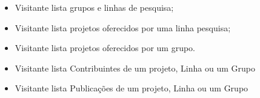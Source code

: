 \documentclass[11pt, a4paper]{article}
\begin{document}
\begin{itemize}
\begin{itemize}
                    \item Visitante lista grupos e linhas de pesquisa;
                    
                    \item Visitante lista projetos oferecidos por uma linha
                    pesquisa;
                    
                    \item Visitante lista projetos oferecidos por um grupo.

		\item Visitante lista Contribuintes de um projeto, Linha ou um Grupo

		\item Visitante lista Publicações de um projeto, Linha ou um Grupo
                    
                \end{itemize}
        \end{itemize}
\end{document}
